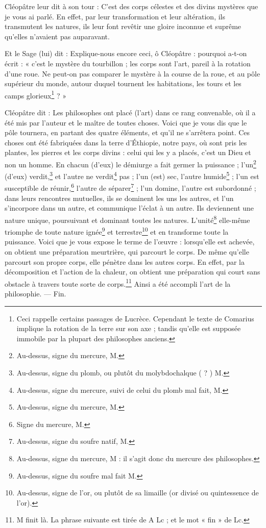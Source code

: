\documentclass[a4paper, 11pt, oneside, polutonikogreek, french]{article}
\begin{document}
Cléopâtre leur dit à son tour : C'est des corps célestes et des divins mystères que je vous ai parlé. En effet, par leur transformation et leur altération, ils transmutent les natures, ils leur font revêtir une gloire inconnue et suprême qu'elles n'avaient pas auparavant.

Et le Sage (lui) dit : Explique-nous encore ceci, ô Cléopâtre : pourquoi a-t-on écrit : « c'est le mystère du tourbillon ; les corps sont l'art, pareil à la rotation d'une roue. Ne peut-on pas comparer le mystère à la course de la roue, et au pôle supérieur du monde, autour duquel tournent les habitations, les tours et les camps glorieux\footnote{Ceci rappelle certains passages de Lucrèce. Cependant le texte de Comarius implique la rotation de la terre sur son axe ; tandis qu'elle est supposée immobile par la plupart des philosophes anciens.} ? »

Cléopâtre dit : Les philosophes ont placé (l'art) dans ce rang convenable, où il a été mis par l'auteur et le maître de toutes choses. Voici que je vous dis que le pôle tournera, en partant des quatre éléments, et qu'il ne s'arrêtera point. Ces choses ont été fabriquées dans la terre d'Éthiopie, notre pays, où sont pris les plantes, les pierres et les corps divins : celui qui les y a placés, c'est un Dieu et non un homme. En chacun (d'eux) le démiurge a fait germer la puissance ; l'un\footnote{Au-dessus, signe du mercure, M.} (d'eux) verdit,\footnote{Au-dessus, signe du plomb, ou plutôt du molybdochalque ( ? ) M.} et l'autre ne verdit\footnote{Au-dessus, signe du mercure, suivi de celui du plomb mal fait, M.} pas ; l'un (est) sec, l'autre humide\footnote{Au-dessus, signe du mercure, M.} ; l'un est susceptible de réunir,\footnote{Signe du mercure, M.} l'autre de séparer\footnote{Au-dessus, signe du soufre natif, M.} ; l'un domine, l'autre est subordonné ; dans leurs rencontres mutuelles, ils se dominent les uns les autres, et l'un s'incorpore dans un autre, et communique l'éclat à un autre. Ils deviennent une nature unique, poursuivant et dominant toutes les natures. L'unité\footnote{Au-dessus, signe du mercure, M : il s'agit donc du mercure des philosophes.} elle-même triomphe de toute nature ignée\footnote{Au-dessus, signe du soufre mal fait M.} et terrestre\footnote{Au-dessus, signe de l'or, ou plutôt de sa limaille (or divisé ou quintessence de l'or).} et en transforme toute la puissance. Voici que je vous expose le terme de l'œuvre : lorsqu'elle est achevée, on obtient une préparation meurtrière, qui parcourt le corps. De même qu'elle parcourt son propre corps, elle pénètre dans les autres corps. En effet, par la décomposition et l'action de la chaleur, on obtient une préparation qui court sans obstacle à travers toute sorte de corps.\footnote{M finit là. La phrase suivante est tirée de A Lc ; et le mot « fin » de Lc.} Ainsi a été accompli l'art de la philosophie. --- Fin.
\end{document}
